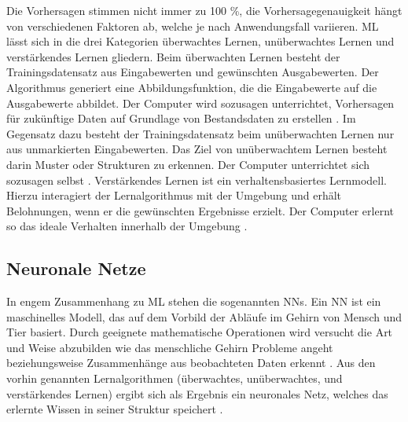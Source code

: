 Die Vorhersagen stimmen nicht immer zu 100 \%, die Vorhersagegenauigkeit hängt von verschiedenen Faktoren ab, welche je nach Anwendungsfall variieren.
\newline
\ac{ML} lässt sich in die drei Kategorien überwachtes Lernen, unüberwachtes Lernen und verstärkendes Lernen gliedern.
Beim überwachten Lernen besteht der Trainingsdatensatz aus Eingabewerten und gewünschten Ausgabewerten.
Der Algorithmus generiert eine Abbildungsfunktion, die die Eingabewerte auf die Ausgabewerte abbildet.
Der Computer wird sozusagen unterrichtet, Vorhersagen für zukünftige Daten auf Grundlage von Bestandsdaten zu erstellen \autocite[vgl][S. 11]{thakkar_beginning_2019}.
Im Gegensatz dazu besteht der Trainingsdatensatz beim unüberwachten Lernen nur aus unmarkierten Eingabewerten.
Das Ziel von unüberwachtem Lernen besteht darin Muster oder Strukturen zu erkennen.
Der Computer unterrichtet sich sozusagen selbst \autocites[vgl.][S. 11-12]{thakkar_beginning_2019}[vgl.][S. 6]{etaati_machine_2019}.
Verstärkendes Lernen ist ein verhaltensbasiertes Lernmodell.
Hierzu interagiert der Lernalgorithmus mit der Umgebung und erhält Belohnungen, wenn er die gewünschten Ergebnisse erzielt. 
Der Computer erlernt so das ideale Verhalten innerhalb der Umgebung \autocite[vgl][S. 12]{thakkar_beginning_2019}.

\subsection{Neuronale Netze}\label{sec:neuronaleNetze}

\textauthor{\vLB}{}{}

In engem Zusammenhang zu \acl{ML} stehen die sogenannten \aclp{NN}.
Ein \ac{NN} ist ein maschinelles Modell, das auf dem Vorbild der Abläufe im Gehirn von Mensch und Tier basiert.
Durch geeignete mathematische Operationen wird versucht die Art und Weise abzubilden wie das menschliche Gehirn Probleme angeht beziehungsweise Zusammenhänge aus beobachteten Daten erkennt \autocites[vgl.][S. 604]{backhaus_multivariate_2016}[vgl.][S. 31]{judith_hurwitz_machine_2018}.
Aus den vorhin genannten Lernalgorithmen (überwachtes, unüberwachtes, und verstärkendes Lernen) ergibt sich als Ergebnis ein neuronales Netz, welches das erlernte Wissen in seiner Struktur speichert \autocite[vgl.][S. 427]{guresen_definition_2011}.

